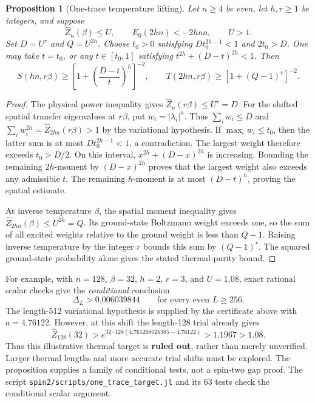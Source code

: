 \documentclass[11pt]{article}
\newtheorem{proposition}{Proposition}
\begin{document}
\begin{proposition}[One-trace temperature lifting]
Let $n\ge4$ be even, let $h,r\ge1$ be integers, and suppose
\[
 \widehat Z_n(\beta)\le U,\qquad E_0(2hn)<-2hna,\qquad U>1.
\]
Set $D=U^r$ and $Q=U^{2h}$. Choose $t_0>0$ satisfying
$Dt_0^{2h-1}<1$ and $2t_0>D$. One may take $t=t_0$, or any
$t\in[t_0,1]$ satisfying $t^{2h}+(D-t)^{2h}<1$. Then
\[
 S(hn,r\beta)\ge
 \left[1+\left(\frac{D-t}{t}\right)^h\right]^{-2},\qquad
 T(2hn,r\beta)\ge[1+(Q-1)^r]^{-2}.
\]
\end{proposition}
\begin{proof}
The physical power inequality gives $\widehat Z_n(r\beta)\le U^r=D$.
For the shifted spatial transfer eigenvalues at $r\beta$, put
$w_i=|\lambda_i|^n$. Thus $\sum_iw_i\le D$ and
$\sum_iw_i^{2h}=\widehat Z_{2hn}(r\beta)>1$ by the variational hypothesis.
If $\max_iw_i\le t_0$, then the latter sum is at most
$Dt_0^{2h-1}<1$, a contradiction. The largest weight therefore exceeds
$t_0>D/2$. On this interval, $x^{2h}+(D-x)^{2h}$ is increasing.
Bounding the remaining $2h$-moment by $(D-x)^{2h}$ proves that the largest
weight also exceeds any admissible $t$. The remaining $h$-moment is at most
$(D-t)^h$, proving the spatial estimate.

At inverse temperature $\beta$, the spatial moment inequality gives
$\widehat Z_{2hn}(\beta)\le U^{2h}=Q$. Its ground-state Boltzmann weight
exceeds one, so the sum of all excited weights relative to the ground
weight is less than $Q-1$. Raising inverse temperature by the integer $r$
bounds this sum by $(Q-1)^r$. The squared ground-state probability alone
gives the stated thermal-purity bound.
\end{proof}

For example, with $n=128$, $\beta=32$, $h=2$, $r=3$, and $U=1.08$, exact
rational scalar checks give the \emph{conditional} conclusion
\[
 \Delta_L>0.006039844\qquad\text{for every even }L\ge256.
\]
The length-512 variational hypothesis is supplied by the certificate above
with $a=4.76122$. However, at this shift the length-128 trial already gives
\[
 \widehat Z_{128}(32)>
 e^{32\cdot128(4.761268026385-4.76122)}>1.1967>1.08.
\]
Thus this illustrative thermal target is \textbf{ruled out}, rather than
merely unverified. Larger thermal lengths and more accurate trial shifts
must be explored. The proposition supplies a family of conditional tests,
not a spin-two gap proof.
The script \texttt{spin2/scripts/one\_trace\_target.jl} and its 63 tests
check the conditional scalar argument.
\end{document}
